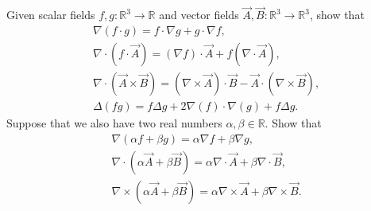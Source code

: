 \documentclass[11pt]{article}
\begin{document}
\begin{exercise}
	Given scalar fields $f, g : \mathbb{R}^3 \to \mathbb{R}$ and vector fields $\vec{A}, \vec{B} : \mathbb{R}^3 \to \mathbb{R}^3$,
    show that 
    \begin{gather*}
        \nabla\left( f \cdot g \right)
        = 
        f \cdot \nabla g
        +
        g \cdot \nabla f
        ,
        \\
        \nabla\cdot\left( f \cdot \vec{A} \right)
        = 
        ( \nabla f ) \cdot \vec{A}
        +
        f ( \nabla \cdot \vec{A} )
        ,
        \\ 
        \nabla\cdot\left( \vec{A} \times \vec{B} \right)
        = 
        \left( \nabla\times\vec{A} \right) \cdot \vec{B}
        -
        \vec{A} \cdot \left( \nabla\times\vec{B} \right)
        ,
        \\ 
        \Delta ( f g )
        = 
        f \Delta g + 2 \nabla(f) \cdot \nabla( g ) + f \Delta g
        .
    \end{gather*}
    Suppose that we also have two real numbers $\alpha, \beta \in \mathbb R$.
    Show that 
    \begin{gather*}
        \nabla( \alpha f + \beta g )
        = 
        \alpha \nabla f + \beta \nabla g
        ,
        \\ 
        \nabla\cdot ( \alpha \vec{A} + \beta \vec{B} )
        = 
        \alpha \nabla\cdot \vec{A} + \beta \nabla\cdot \vec{B}
        ,
        \\ 
        \nabla\times ( \alpha \vec{A} + \beta \vec{B} )
        = 
        \alpha \nabla\times \vec{A} + \beta \nabla\times \vec{B}
        .
    \end{gather*}
\end{exercise}
\end{document}
